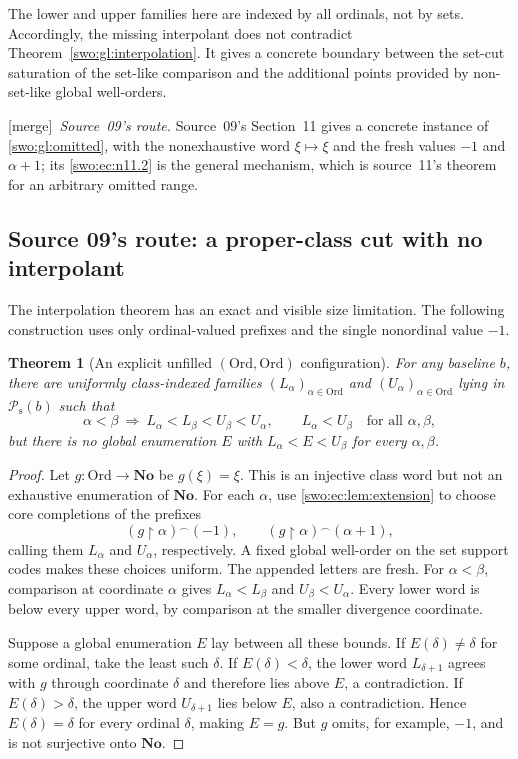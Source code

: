 \documentclass[11pt]{article}
\newtheorem{theorem}{Theorem}[section]
\theoremstyle{definition}
\theoremstyle{remark}
\newcommand{\No}{\mathbf{No}}
\newcommand{\Ord}{\mathrm{Ord}}
\newcommand{\Psupp}{\mathcal P_{\mathrm{s}}}
\newcommand{\concat}{\mathbin{{}^\frown}}
\newcommand{\res}{\mathbin{\upharpoonright}}
\newcommand{\merge}{\textsf{[merge]}}
\begin{document}
The lower and upper families here are indexed by all ordinals, not by sets.
Accordingly, the missing interpolant does not contradict
Theorem~\ref{swo:gl:interpolation}.  It gives a concrete boundary between the
set-cut saturation of the set-like comparison and the additional points
provided by non-set-like global well-orders.


\merge\ \emph{Source~09's route.} Source~09's Section~11 gives a concrete
instance of \cref{swo:gl:omitted}, with the nonexhaustive word $\xi\mapsto\xi$
and the fresh values $-1$ and $\alpha+1$; its \cref{swo:ec:n11.2} is the
general mechanism, which is source~11's theorem for an arbitrary omitted range.


\subsection{Source 09's route: a proper-class cut with no interpolant}
\label{swo:ec:sec:gap}
The interpolation theorem has an exact and visible size limitation.
The following construction uses only ordinal-valued prefixes and the
single nonordinal value $-1$.

\begin{theorem}[An explicit unfilled $(\Ord,\Ord)$ configuration]
\label{swo:ec:thm:class-gap}
For any baseline $b$, there are uniformly class-indexed families
$(L_\alpha)_{\alpha\in\Ord}$ and $(U_\alpha)_{\alpha\in\Ord}$ lying in
$\Psupp(b)$ such that
\[
 \alpha<\beta\ \Longrightarrow\ L_\alpha<L_\beta<U_\beta<U_\alpha,
 \qquad L_\alpha<U_\beta\quad\text{for all }\alpha,\beta,
\]
but there is no global enumeration $E$ with
$L_\alpha<E<U_\beta$ for every $\alpha,\beta$.
\end{theorem}
\begin{proof}
Let $g:\Ord\to\No$ be $g(\xi)=\xi$. This is an injective class word but
not an exhaustive enumeration of $\No$. For each $\alpha$, use
\cref{swo:ec:lem:extension} to choose core completions of the prefixes
\[
 (g\res\alpha)\concat(-1),
       \qquad
 (g\res\alpha)\concat(\alpha+1),
\]
calling them $L_\alpha$ and $U_\alpha$, respectively. A fixed global
well-order on the set support codes makes these choices uniform.
The appended letters are fresh. For $\alpha<\beta$, comparison at
coordinate $\alpha$ gives
$L_\alpha<L_\beta$ and $U_\beta<U_\alpha$. Every lower word is below
every upper word, by comparison at the smaller divergence coordinate.

Suppose a global enumeration $E$ lay between all these bounds. If
$E(\delta)\ne\delta$ for some ordinal, take the least such $\delta$.
If $E(\delta)<\delta$, the lower word $L_{\delta+1}$ agrees with $g$
through coordinate $\delta$ and therefore lies above $E$, a contradiction.
If $E(\delta)>\delta$, the upper word $U_{\delta+1}$ lies below $E$,
also a contradiction. Hence $E(\delta)=\delta$ for every ordinal
$\delta$, making $E=g$. But $g$ omits, for example, $-1$, and is not
surjective onto $\No$.
\end{proof}
\end{document}
